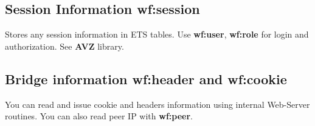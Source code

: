 \subsection{Session Information {\bf wf:session}}
Stores any session information in ETS tables. Use {\bf wf:user}, {\bf wf:role} for
login and authorization. See {\bf AVZ} library.

\subsection{Bridge information {\bf wf:header} and {\bf wf:cookie}}
You can read and issue cookie and headers information using internal Web-Server routines.
You can also read peer IP with {\bf wf:peer}.


